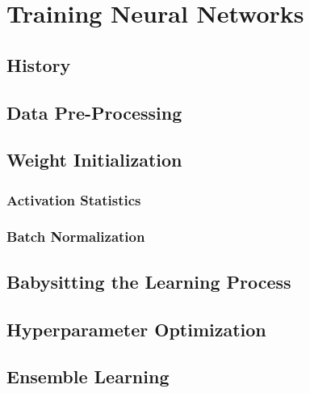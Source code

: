 \chapter{Training Neural Networks} %

	\section{History} %

	\section{Data Pre-Processing} %

	\section{Weight Initialization} %

		\subsection{Activation Statistics} %

		\subsection{Batch Normalization} %

	\section{Babysitting the Learning Process} %

	\section{Hyperparameter Optimization} %

	\section{Ensemble Learning} %

